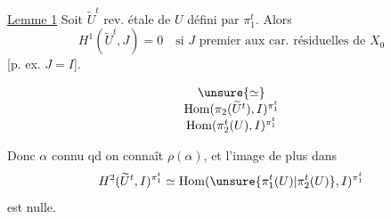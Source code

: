 \uline{Lemme 1} Soit $\widetilde U^t$ rev. étale de $U$ défini par
$\pi_1^t$. Alors
\[
H^1(\widetilde U^t,J)=0
\quad\text{si }J\text{ premier aux car. résiduelles de }X_0
\]
[p. ex. $J=I$].

\[
\begin{array}{c}
\unsure{\simeq}\\
\operatorname{Hom}(\pi_2(\widetilde U^t),I)^{\pi_1^t}\\
\operatorname{Hom}(\pi_2^t(U),I)^{\pi_1^t}
\end{array}
\]

Donc $\alpha$ connu qd on connaît
$\rho(\alpha)$, et l'image de plus dans
\[
H^2(\widetilde U^t,I)^{\pi_1^t}
\simeq\operatorname{Hom}(\unsure{\pi_1^t(U)|\pi_2^t(U)},I)^{\pi_1^t}
\]
est nulle.
